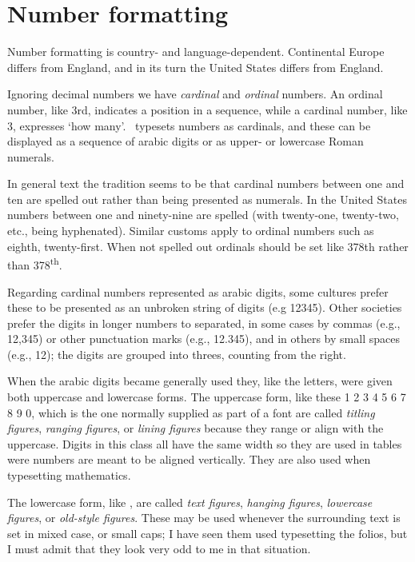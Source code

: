 \documentclass[10pt,a4paper,oneside,extrafontsizes]{memoir}%
\begin{document}

\section{Number formatting}

\begin{paracol}{2}
\switchEng
    Number formatting is country- and language-dependent. Continental 
Europe differs
from England, and in its turn the United States differs from England.

    Ignoring decimal numbers we have \emph{cardinal} and \emph{ordinal}
numbers. An ordinal number, like 3rd, 
indicates a position in a sequence,
while a cardinal number, like 3, 
expresses `how many'. \ltx\ typesets
numbers as cardinals, and these can be displayed as a sequence of
arabic digits or as upper- or lowercase Roman numerals. 

    In general text the tradition seems to be that cardinal numbers between
one and ten are spelled out rather than being presented as numerals.
In the United States numbers between one and ninety-nine are spelled (with
twenty-one, twenty-two, etc., being hyphenated). Similar customs
apply to ordinal numbers such as eighth, twenty-first. When not spelled out
ordinals should be set like 378th rather than 378\textsuperscript{th}.


    Regarding cardinal numbers represented as arabic digits,
some cultures prefer these to be presented as an unbroken string of
digits (e.g 12345). Other societies prefer the digits in longer 
numbers to separated, in some cases by commas (e.g., 12,345) or other 
punctuation marks (e.g., 12.345), and in others by small spaces (e.g., 12); 
the digits are grouped into threes, counting from the right.

   When the arabic digits became generally used they, like the letters, 
were given both uppercase and lowercase forms. The uppercase form, like these
1 2 3 4 5 6 7 8 9 0, which
is the one normally supplied as part of a font are called 
\emph{titling figures}, 
\emph{ranging figures}, or
\emph{lining figures} because
they range or align with the uppercase.
Digits in this class all
have the same width so they are used in tables were numbers are meant to
be aligned vertically. They are also used when typesetting mathematics.

    The lowercase form, like , are called
\emph{text figures},
\emph{hanging figures},
\emph{lowercase figures}, or
\emph{old-style figures}.
These may be used whenever the surrounding text is set in mixed case, or small caps; I
have seen them used typesetting the folios, but I must admit that they look very odd
to me in that situation.


\end{paracol}
\end{document}
